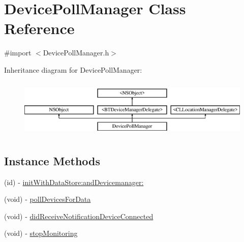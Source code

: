 \hypertarget{interface_device_poll_manager}{\section{Device\-Poll\-Manager Class Reference}
\label{interface_device_poll_manager}
}


{\ttfamily \#import $<$Device\-Poll\-Manager.\-h$>$}

Inheritance diagram for Device\-Poll\-Manager\-:\begin{figure}[H]
\begin{center}
\leavevmode
\includegraphics[height=2.814070cm]{interface_device_poll_manager}
\end{center}
\end{figure}
\subsection*{Instance Methods}
\begin{DoxyCompactItemize}
\item 
(id) -\/ \hyperlink{interface_device_poll_manager_ac1637206b4271575f8b2afd39375125b}{init\-With\-Data\-Store\-:and\-Devicemanager\-:}
\item 
(void) -\/ \hyperlink{interface_device_poll_manager_ac0c31de4251c9eac9b21594cc866f165}{poll\-Devices\-For\-Data}
\item 
(void) -\/ \hyperlink{interface_device_poll_manager_a91b7db2f338c98f0d653e8a33d95b736}{did\-Receive\-Notification\-Device\-Connected}
\item 
(void) -\/ \hyperlink{interface_device_poll_manager_a4fe6160b06d23999e8939c88e900b232}{stop\-Monitoring}
\end{DoxyCompactItemize}
